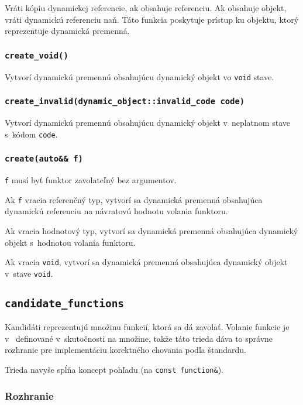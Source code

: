 Vráti kópiu dynamickej referencie, ak obsahuje referenciu. Ak obsahuje objekt, vráti dynamickú referenciu naň. Táto funkcia poskytuje prístup ku objektu, ktorý reprezentuje dynamická premenná.

\subsubsection{\texttt{create\_void()}}

Vytvorí dynamickú premennú obsahujúcu dynamický objekt vo \texttt{void} stave.

\subsubsection{\texttt{create\_invalid(dynamic\_object::invalid\_code code)}}

Vytvorí dynamickú premennú obsahujúcu dynamický objekt v~neplatnom stave s~kódom \texttt{code}.

\subsubsection{\texttt{create(auto\&\& f)}}

\texttt{f} musí byť funktor zavolateľný bez argumentov.

Ak \texttt{f} vracia referenčný typ, vytvorí sa dynamická premenná obsahujúca dynamickú referenciu na návratovú hodnotu volania funktoru.

Ak vracia hodnotový typ, vytvorí sa dynamická premenná obsahujúca dynamický objekt s~hodnotou volania funktoru.

Ak vracia \texttt{void}, vytvorí sa dynamická premenná obsahujúca dynamický objekt v~stave \texttt{void}.

\subsection{\texttt{candidate\_functions}}

Kandidáti reprezentujú množinu funkcií, ktorá sa dá zavolať. Volanie funkcie je v~\Cpp{} definované v~skutočnosti na množine, takže táto trieda dáva to správne rozhranie pre implementáciu korektného chovania podľa štandardu.

Trieda navyše spĺňa koncept pohľadu (na \texttt{const function\&}).

\subsubsection{Rozhranie}

